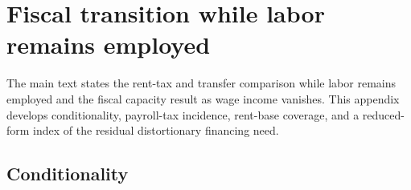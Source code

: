 \documentclass[12pt]{article}
\theoremstyle{plain}
\theoremstyle{definition}
\theoremstyle{remark}
\begin{document}

\section{Fiscal transition while labor remains employed}\label{app:D}

The main text states the rent-tax and transfer comparison while labor remains employed and the fiscal capacity result as wage income vanishes. This appendix develops conditionality, payroll-tax incidence, rent-base coverage, and a reduced-form index of the residual distortionary financing need.

\subsection{Conditionality}\label{app:D.1}
\end{document}
